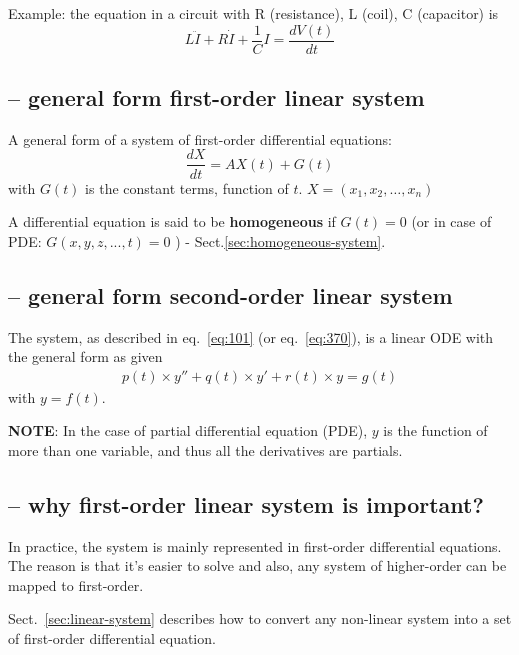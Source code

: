 Example: the equation in a circuit with R (resistance), L (coil), C
(capacitor) is
\begin{equation}
  \label{eq:370}
  L\ddot{I}+R\dot{I}+\frac{1}{C}I=\frac{dV(t)}{dt}
\end{equation}

\subsection{-- general form first-order linear system}
\label{sec:first-order-linear-system}

A general form of a system of first-order differential equations:
\begin{equation}
  \label{eq:652}
  \frac{dX}{dt} = AX(t) + G(t)
\end{equation}
with $G(t)$ is the constant terms, function of
$t$. $X=(x_1,x_2,\dots,x_n)$ 

A differential equation is said to be {\bf homogeneous} if $G(t)=0$
(or in case of PDE: $G(x,y,z,...,t)=0$ ) - Sect.\ref{sec:homogeneous-system}. 


\subsection{-- general form second-order linear system}

The system, as described in eq.~\eqref{eq:101} (or
eq.~\eqref{eq:370}), is a linear ODE with the general form as given
\begin{eqnarray}
  \label{eq:536}
  p(t) \times y'' + q(t) \times y' + r(t) \times y = g(t)
\end{eqnarray}
with $y=f(t)$. 

{\bf NOTE}: In the case of partial differential equation (PDE),
$y$ is the function of more than one variable, and thus all the
derivatives are partials.

\subsection{-- why first-order linear system is important?}

In practice, the system is mainly represented in first-order differential
equations. The reason is that it's easier to solve and also, any system of
higher-order can be mapped to first-order.

Sect.~\ref{sec:linear-system} describes how to convert any non-linear system
into a set of first-order differential equation.




